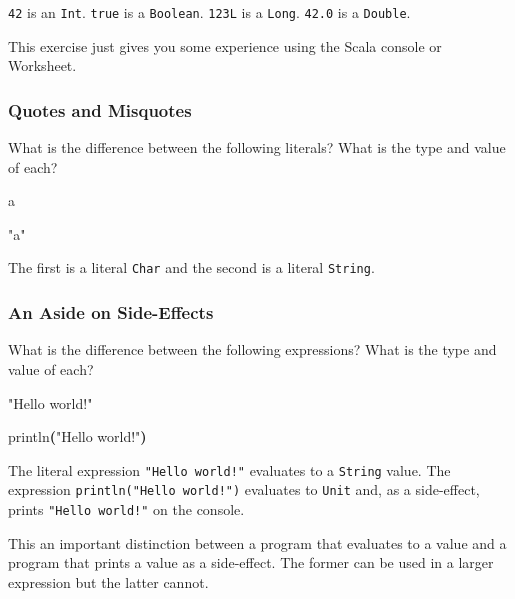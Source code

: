\documentclass[11pt,a5paper,]{book}
\newenvironment{Shaded}{\begin{snugshade}}{\end{snugshade}}
\newcommand{\CharTok}[1]{\textcolor[rgb]{0.31,0.60,0.02}{#1}}
\newcommand{\FunctionTok}[1]{\textcolor[rgb]{0.00,0.00,0.00}{#1}}
\newcommand{\OperatorTok}[1]{\textcolor[rgb]{0.81,0.36,0.00}{\textbf{#1}}}
\newcommand{\StringTok}[1]{\textcolor[rgb]{0.31,0.60,0.02}{#1}}
\begin{document}
\texttt{42} is an \texttt{Int}. \texttt{true} is a \texttt{Boolean}.
\texttt{123L} is a \texttt{Long}. \texttt{42.0} is a \texttt{Double}.

This exercise just gives you some experience using the Scala console or
Worksheet.

\hypertarget{quotes-and-misquotes}{%
\subsubsection{Quotes and Misquotes}\label{quotes-and-misquotes}}

What is the difference between the following literals? What is the type
and value of each?

\begin{Shaded}
\begin{Highlighting}[]
\CharTok{\textquotesingle{}a\textquotesingle{}}

\StringTok{"a"}
\end{Highlighting}
\end{Shaded}

The first is a literal \texttt{Char} and the second is a literal
\texttt{String}.

\hypertarget{an-aside-on-side-effects}{%
\subsubsection{An Aside on
Side-Effects}\label{an-aside-on-side-effects}}

What is the difference between the following expressions? What is the
type and value of each?

\begin{Shaded}
\begin{Highlighting}[]
\StringTok{"Hello world!"}

\FunctionTok{println}\OperatorTok{(}\StringTok{"Hello world!"}\OperatorTok{)}
\end{Highlighting}
\end{Shaded}

The literal expression \texttt{"Hello\ world!"} evaluates to a
\texttt{String} value. The expression \texttt{println("Hello\ world!")}
evaluates to \texttt{Unit} and, as a side-effect, prints
\texttt{"Hello\ world!"} on the console.

This an important distinction between a program that evaluates to a
value and a program that prints a value as a side-effect. The former can
be used in a larger expression but the latter cannot.
\end{document}
